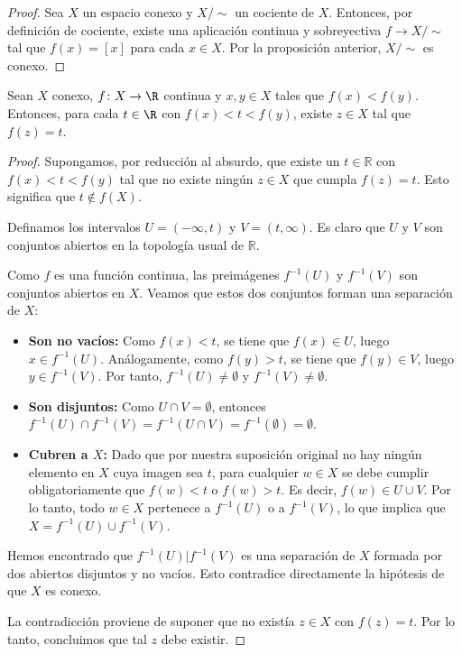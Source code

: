 \begin{proof}
    Sea $X$ un espacio conexo y $X/\sim$ un cociente de $X$. Entonces, por definición de cociente, existe una aplicación continua y sobreyectiva $f \to X/\sim$ tal que $f(x) = [x]$ para cada $x \in X$. Por la proposición anterior, $X/\sim$ es conexo.
\end{proof}
\begin{teorema}
    Sean $X$ conexo, $f \colon X \to \R$ continua y $x, y \in X$ tales que $f(x) < f(y)$. Entonces, para cada $t \in \R$ con $f(x) < t < f(y)$, existe $z \in X$ tal que $f(z) = t$.
\end{teorema}
\begin{proof}
    Supongamos, por reducción al absurdo, que existe un $t \in \mathbb{R}$ con $f(x) < t < f(y)$ tal que no existe ningún $z \in X$ que cumpla $f(z) = t$. Esto significa que $t \notin f(X)$.

    Definamos los intervalos $U = (-\infty, t)$ y $V = (t, \infty)$. Es claro que $U$ y $V$ son conjuntos abiertos en la topología usual de $\mathbb{R}$. 
    
    Como $f$ es una función continua, las preimágenes $f^{-1}(U)$ y $f^{-1}(V)$ son conjuntos abiertos en $X$. Veamos que estos dos conjuntos forman una separación de $X$:
    
    \begin{itemize}
        \item \textbf{Son no vacíos:} Como $f(x) < t$, se tiene que $f(x) \in U$, luego $x \in f^{-1}(U)$. Análogamente, como $f(y) > t$, se tiene que $f(y) \in V$, luego $y \in f^{-1}(V)$. Por tanto, $f^{-1}(U) \neq \emptyset$ y $f^{-1}(V) \neq \emptyset$.
        \item \textbf{Son disjuntos:} Como $U \cap V = \emptyset$, entonces $f^{-1}(U) \cap f^{-1}(V) = f^{-1}(U \cap V) = f^{-1}(\emptyset) = \emptyset$.
        \item \textbf{Cubren a $X$:} Dado que por nuestra suposición original no hay ningún elemento en $X$ cuya imagen sea $t$, para cualquier $w \in X$ se debe cumplir obligatoriamente que $f(w) < t$ o $f(w) > t$. Es decir, $f(w) \in U \cup V$. Por lo tanto, todo $w \in X$ pertenece a $f^{-1}(U)$ o a $f^{-1}(V)$, lo que implica que $X = f^{-1}(U) \cup f^{-1}(V)$.
    \end{itemize}
    
    Hemos encontrado que $f^{-1}(U) | f^{-1}(V)$ es una separación de $X$ formada por dos abiertos disjuntos y no vacíos. Esto contradice directamente la hipótesis de que $X$ es conexo. 
    
    La contradicción proviene de suponer que no existía $z \in X$ con $f(z) = t$. Por lo tanto, concluimos que tal $z$ debe existir.
\end{proof}
